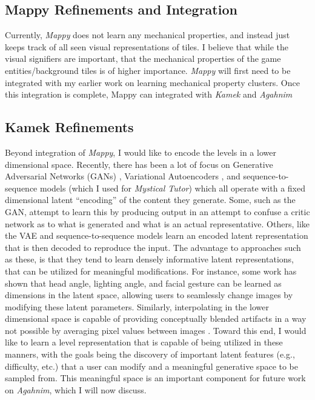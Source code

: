 \documentclass[12pt]{report}
\begin{document}
\subsection*{Mappy Refinements and Integration}

 Currently, \textit{Mappy} does not learn any mechanical properties, and instead just keeps track of all seen visual representations of tiles.  I believe that while the visual signifiers are important, that the mechanical properties of the game entities/background tiles is of higher importance. \textit{Mappy} will first need to be integrated with my earlier work on learning mechanical property clusters. Once this integration is complete, Mappy can integrated with \textit{Kamek} and \textit{Agahnim}

\subsection*{Kamek Refinements}

Beyond integration of \textit{Mappy}, 
I would like to encode the levels in a lower dimensional space.  Recently, there has been a lot of focus on Generative Adversarial Networks (GANs) \cite{gans}, Variational Autoencoders \cite{vae}, and sequence-to-sequence models \cite{seq2seq} (which I used for \textit{Mystical Tutor}) which all operate with a fixed dimensional latent ``encoding'' of the content they generate.  Some, such as the GAN, attempt to learn this by producing output in an attempt to confuse a critic network as to what is generated and what is an actual representative. Others, like the VAE and sequence-to-sequence models learn an encoded latent representation that is then decoded to reproduce the input.  The advantage to approaches such as these, is that they tend to learn densely informative latent representations, that can be utilized for meaningful modifications.  For instance, some work has shown that head angle, lighting angle, and facial gesture \cite{chen2016infogan} can be learned as dimensions in the latent space, allowing users to seamlessly change images by modifying these latent parameters.  Similarly, interpolating in the lower dimensional space is capable of providing conceptually blended artifacts in a way not possible by averaging pixel values between images \cite{ganinterpolation}.  Toward this end, I would like to learn a level representation that is capable of being utilized in these manners, with the goals being the discovery of important latent features (e.g., difficulty, etc.) that a user can modify and a meaningful generative space to be sampled from.  This meaningful space is an important component for future work on \textit{Agahnim}, which I will now discuss.
\end{document}
